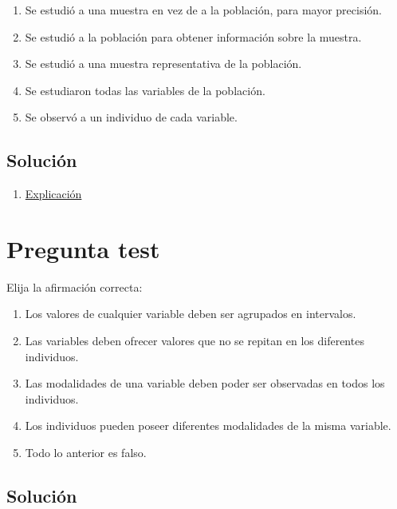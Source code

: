 \documentclass[
]{book}
\providecommand{\tightlist}{%
  \setlength{\itemsep}{0pt}\setlength{\parskip}{0pt}}
\begin{document}
\begin{enumerate}
\def\labelenumi{\alph{enumi})}
\tightlist
\item
  Se estudió a una muestra en vez de a la población, para mayor precisión.
\item
  Se estudió a la población para obtener información sobre la muestra.
\item
  Se estudió a una muestra representativa de la población.
\item
  Se estudiaron todas las variables de la población.
\item
  Se observó a un individuo de cada variable.
\end{enumerate}

\hypertarget{soluciuxf3n-8}{%
\subsection{Solución}\label{soluciuxf3n-8}}

\begin{enumerate}
\def\labelenumi{\alph{enumi})}
\setcounter{enumi}{2}
\tightlist
\item
  \href{https://1fjmanzano.github.io/bioestadistica/me\%CC\%81todos-de-muestreo.html}{Explicación}
\end{enumerate}

\hypertarget{pregunta-test-7}{%
\section{Pregunta test}\label{pregunta-test-7}}

Elija la afirmación correcta:

\begin{enumerate}
\def\labelenumi{\alph{enumi})}
\tightlist
\item
  Los valores de cualquier variable deben ser agrupados en intervalos.
\item
  Las variables deben ofrecer valores que no se repitan en los diferentes individuos.
\item
  Las modalidades de una variable deben poder ser observadas en todos los individuos.
\item
  Los individuos pueden poseer diferentes modalidades de la misma variable.
\item
  Todo lo anterior es falso.
\end{enumerate}

\hypertarget{soluciuxf3n-9}{%
\subsection{Solución}\label{soluciuxf3n-9}}
\end{document}

